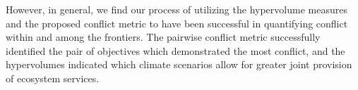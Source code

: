However, in general, we find our process of utilizing the hypervolume measures and the proposed conflict metric to have been successful in quantifying conflict within and among the frontiers. The pairwise conflict metric successfully identified the pair of objectives which demonstrated the most conflict, and the hypervolumes indicated which climate scenarios allow for greater joint provision of ecosystem services.